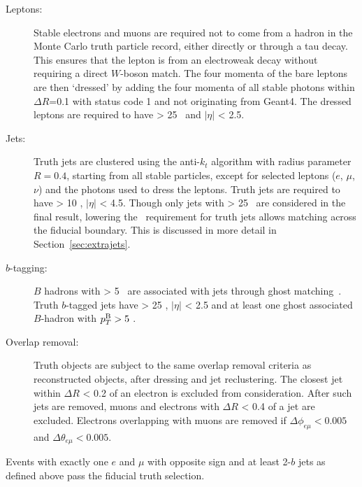\begin{description}
\item[Leptons:] Stable electrons and muons are required not to come from a hadron in the Monte Carlo truth particle record, either directly or through a tau decay. This ensures that the lepton is from an electroweak decay without requiring a direct $W$-boson match. The four momenta of the bare leptons are then `dressed' by adding the four momenta of all stable photons within $\Delta R$=0.1 with status code 1 and not originating from Geant4. The dressed leptons are required to have \pt > 25 \GeV\ and $|\eta|$ < 2.5.
\item[Jets:] Truth jets are clustered using the anti-$k_t$ algorithm \cite{antikt} with radius parameter $R=0.4$, starting from all stable particles, except for selected leptons ($e$, $\mu$, $\nu$) and the photons used to dress the leptons. Truth jets are required to have \pT > 10 \GeV, $|\eta|$ < 4.5. Though only jets with \pT > 25 \GeV\ are considered in the final result, lowering the \pt\ requirement for truth jets allows matching across the fiducial boundary. This is discussed in more detail in Section~\ref{sec:extrajets}.

\item[$b$-tagging:] $B$ hadrons with \pT > 5 \GeV\ are associated with jets through ghost matching~\cite{ghostmatch}. Truth $b$-tagged jets have \pT > 25 \GeV, $|\eta|$ < 2.5 and at least one ghost associated $B$-hadron with $p^{{\textrm B}}_{T} > 5$ \GeV.

\item[Overlap removal:] Truth objects are subject to the same overlap removal criteria as reconstructed objects, after dressing and jet reclustering. The closest jet within $\Delta R$ < 0.2 of an electron is excluded from consideration.  After such jets are removed, 
muons  and electrons with $\Delta R$ < 0.4 of a jet are excluded. Electrons overlapping with muons are removed if $\Delta \phi_{e\mu} < 0.005$ and $\Delta \theta_{e\mu} < 0.005$.
\end{description}


Events with exactly one $e$ and $\mu$ with opposite sign and at least 2-$b$ jets as defined above pass the fiducial truth selection.

